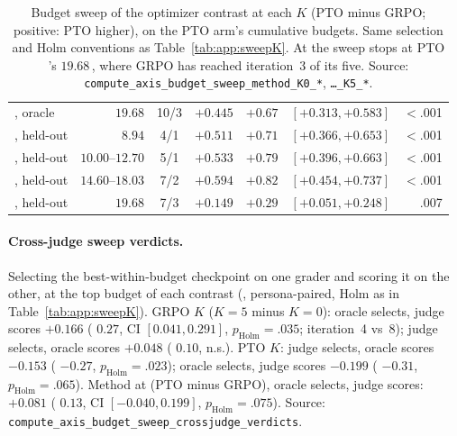 \begin{table}[t]
\begin{tabular}{@{}l r c rrlr@{}}
\Kf{}, oracle & $19.68$ & 10/3 & $+0.445$ & $+0.67$ & $[+0.313, +0.583]$ & $<$.001 \\
\addlinespace[2pt]
\Kf{}, held-out & $8.94$ & 4/1 & $+0.511$ & $+0.71$ & $[+0.366, +0.653]$ & $<$.001 \\
\Kf{}, held-out & $10.00$--$12.70$ & 5/1 & $+0.533$ & $+0.79$ & $[+0.396, +0.663]$ & $<$.001 \\
\Kf{}, held-out & $14.60$--$18.03$ & 7/2 & $+0.594$ & $+0.82$ & $[+0.454, +0.737]$ & $<$.001 \\
\Kf{}, held-out & $19.68$ & 7/3 & $+0.149$ & $+0.29$ & $[+0.051, +0.248]$ & .007 \\
    \bottomrule
  \end{tabular}
  \caption{Budget sweep of the optimizer contrast at each $K$ (PTO minus GRPO; positive: PTO
    higher), on the PTO arm's cumulative budgets. Same selection and Holm conventions as
    Table~\ref{tab:app:sweepK}. At \Kf{} the sweep stops at PTO \Kf{}'s $19.68$\,\gpuh{}, where GRPO
    \Kf{} has reached iteration~3 of its five. Source:
    \texttt{compute\_axis\_budget\_sweep\_method\_K0\_*}, \texttt{\ldots\_K5\_*}.}
  \label{tab:app:sweepMethod}
\end{table}

\paragraph{Cross-judge sweep verdicts.} Selecting the best-within-budget checkpoint on one grader
and scoring it on the other, at the top budget of each contrast (\QQ{}, persona-paired, Holm as
in Table~\ref{tab:app:sweepK}). GRPO $K$ ($K{=}5$ minus $K{=}0$): oracle selects, judge scores
$+0.166$ (\dz{} $0.27$, CI $[0.041, 0.291]$, $p_{\text{Holm}}{=}.035$; iteration~4 vs~8); judge
selects, oracle scores $+0.048$ (\dz{} $0.10$, n.s.). PTO $K$: judge selects, oracle scores
$-0.153$ (\dz{} $-0.27$, $p_{\text{Holm}}{=}.023$); oracle selects, judge scores $-0.199$
(\dz{} $-0.31$, $p_{\text{Holm}}{=}.065$). Method at \Kf{} (PTO minus GRPO), oracle selects,
judge scores: $+0.081$ (\dz{} $0.13$, CI $[-0.040, 0.199]$, $p_{\text{Holm}}{=}.075$). Source:
\texttt{compute\_axis\_budget\_sweep\_}\allowbreak\texttt{crossjudge\_verdicts}.
